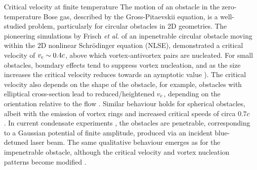 \begin{chapter}{\label{cha:nonequib}Critical velocity at finite temperature}
The motion of an obstacle in the zero-temperature Bose gas, described by the Gross-Pitaevskii equation, is a well-studied problem, particularly for circular obstacles in 2D geometries.  The pioneering simulations by Frisch {\it et al.} \cite{frisch92} of an inpenetrable circular obstacle moving within the 2D nonlinear Schr\"odinger equation (NLSE), demonstrated a critical velocity of $v_{\rm c}\sim 0.4c$, above which vortex-antivortex pairs are nucleated.  For small obstacles, boundary effects tend to suppress vortex nucleation, and as the size increases the critical velocity reduces towards an aymptotic value \cite{berloff_2000,rica_2001,pham_2004}).  The critical velocity also depends on the shape of the obstacle, for example, obstacles with elliptical cross-section lead to reduced/heightened $v_{\rm c}$, depending on the orientation relative to the flow \cite{stagg_2014, stagg_2015b}. Similar behaviour holds for spherical obstacles, albeit with the emission of vortex rings and increased critical speeds of circa $0.7 c$ \cite{winiecki_2000,win01,stagg_2014}. 
In current condensate experiments \cite{Neely,kwon_moon_14,Raman,Onofrio,Inouye,desbuquois_2012, kwon_2015a,kwon_2015b}, the obstacles are penetrable, corresponding to a Gaussian potential of finite amplitude, produced via an incident blue-detuned laser beam.  The same qualitative behaviour emerges as for the impenetrable obstacle, although the critical velocity and vortex nucleation patterns become modified \cite{saito_2010}. 


\end{chapter}
